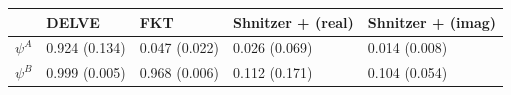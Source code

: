\begin{tabular}{lllll}
\toprule
 & DELVE & FKT & Shnitzer + (real) & Shnitzer + (imag) \\
\midrule
$\psi^A$ & 0.924 (0.134) & 0.047 (0.022) & 0.026 (0.069) & 0.014 (0.008) \\
$\psi^B$ & 0.999 (0.005) & 0.968 (0.006) & 0.112 (0.171) & 0.104 (0.054) \\
\bottomrule
\end{tabular}
